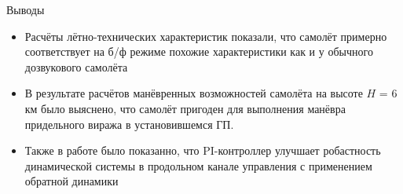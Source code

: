 \begin{frame}{Выводы}
    \begin{itemize}
    \item Расчёты лётно-технических характеристик показали, что самолёт примерно соответствует на б/ф режиме похожие характеристики 
    как и у обычного дозвукового самолёта 
    \item В результате расчётов манёвренных возможностей самолёта на высоте $H$ = 6 км было выяснено, что самолёт пригоден для выполнения 
    манёвра придельного виража в установившемся ГП.
    \item Также в работе было показанно, что PI-контроллер улучшает робастность динамической системы в продольном канале управления с применением обратной динамики
    \end{itemize}
\end{frame}